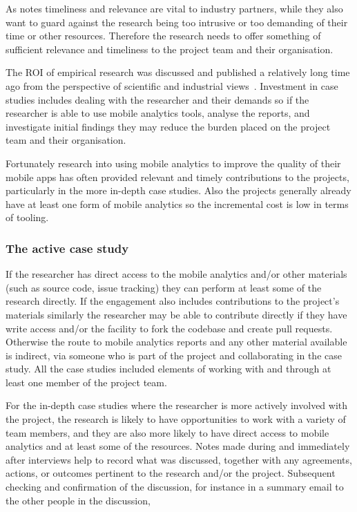 As \citet[p.324]{barroca_2018_bridging_the_gap} notes timeliness and relevance are vital to industry partners, while they also want to guard against the research being too intrusive or too demanding of their time or other resources. Therefore the research needs to offer something of sufficient relevance and timeliness to the project team and their organisation. 

The ROI of empirical research was discussed and published a relatively long time ago from the perspective of scientific and industrial views~\citet[pp54-57]{prechelt_2007_optimizing_ROI_for_empirical_SE_studies}. Investment in case studies includes dealing with the researcher and their demands so if the researcher is able to use mobile analytics tools, analyse the reports, and investigate initial findings they may reduce the burden placed on the project team and their organisation.

Fortunately research into using mobile analytics to improve the quality of their mobile apps has often provided relevant and timely contributions to the projects, particularly in the more in-depth case studies. Also the projects generally already have at least one form of mobile analytics so the incremental cost is low in terms of tooling.
 
\subsubsection{The active case study}
If the researcher has direct access to the mobile analytics and/or other materials (such as source code, issue tracking) they can perform at least some of the research directly. If the engagement also includes contributions to the project's materials similarly the researcher may be able to contribute directly if they have write access and/or the facility to fork the codebase and create pull requests. Otherwise the route to mobile analytics reports and any other material available is indirect, via someone who is part of the project and collaborating in the case study. All the case studies included elements of working with and through at least one member of the project team.

For the in-depth case studies where the researcher is more actively involved with the project, the research is likely to have opportunities to work with a variety of team members, and they are also more likely to have direct access to mobile analytics and at least some of the resources. Notes made during and immediately after interviews help to record what was discussed, together with any agreements, actions, or outcomes pertinent to the research and/or the project. Subsequent checking and confirmation of the discussion, for instance in a summary email to the other people in the discussion, 

